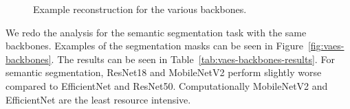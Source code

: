 \begin{figure}[!ht]
    \centering
     \quad
    \caption{Example reconstruction for the various backbones.}
    \label{fig:vae-backbones}
\end{figure}



We redo the analysis for the semantic segmentation task with the same backbones. Examples of the segmentation masks can be seen in Figure~\ref{fig:vaes-backbones}. The results can be seen in Table~\ref{tab:vaes-backbones-results}. For semantic segmentation, ResNet18 and MobileNetV2 perform slightly worse compared to EfficientNet and ResNet50. Computationally MobileNetV2 and EfficientNet are the least resource intensive.

